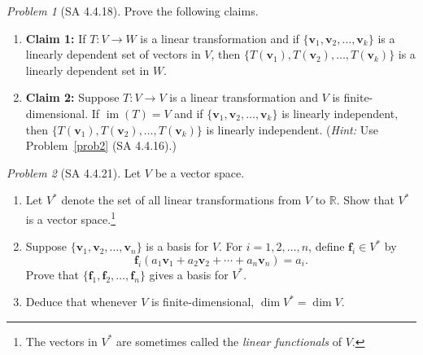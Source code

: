 \documentclass[fleqn,11pt]{paper}
\theoremstyle{remark}
\newtheorem{problem}{Problem}
\newtheorem*{solution}{{\bf Solution}}
\newcommand\R{\fld{R}}
\renewcommand{\dim}{\ensuremath{\operatorname{dim}}}
\newcommand\im{\ensuremath{\operatorname{im}}}
\renewcommand{\vec}[1]{\mathbf{#1}}
\newcommand{\<}{\ensuremath{\langle}}
\renewcommand{\>}{\ensuremath{\rangle}}
\newcommand\fld[1]{\ensuremath{\mathbb{#1}}}
\newcommand\vf{\vec{f}}
\newcommand\vv{\vec{v}}
\begin{document}
\newpage

\begin{problem}[SA 4.4.18]
Prove the following claims.
\begin{enumerate}[{\bf a.}]
\item {\bf Claim 1:}
  If $T : V \to W$ is a linear transformation and  
  if $\{\vv_1, \vv_2, \dots, \vv_k \}$ is a linearly dependent set of vectors in
  $V$, then $\{T(\vv_1), T(\vv_2), \dots , T(\vv_k)\}$ is a 
  linearly dependent set in $W$. 
\item {\bf Claim 2:}
  Suppose $T : V \to V$ is a linear transformation and $V$ is
  finite-dimensional.
  If $\im(T) = V$ and if $\{\vv_1, \vv_2, \dots, \vv_k \}$
  is linearly independent, then $\{T(\vv_1), T(\vv_2), \dots , T(\vv_k)\}$ is 
  linearly independent.
  ({\it Hint:} Use Problem~\ref{prob2} (SA 4.4.16).)
\end{enumerate}
\end{problem}
\newpage

\begin{problem}[SA 4.4.21]
Let $V$ be a vector space.
\begin{enumerate}[{\bf a.}]
\item 
Let $V^\ast$ denote the set of all linear transformations from $V$ to $\R$. 
Show that $V^\ast$ is a vector space.\footnote{The vectors in 
$V^\ast$ are sometimes called the \emph{linear functionals} of $V$.}

\item Suppose $\{\vv_1, \vv_2, \dots, \vv_n\}$ is a basis for $V$. 
For $i = 1, 2, \dots, n$, define $\vf_i \in V^\ast$ by
\[
\vf_i (a_1 \vv_1 + a_2 \vv_2 + \cdots + a_n \vv_n) = a_i.
\]
Prove that $\{\vf_1, \vf_2, \dots, \vf_n\}$ gives a basis for $V^\ast$.
\item Deduce that whenever $V$ is finite-dimensional, $\dim V^\ast = \dim V$.
\end{enumerate}
\end{problem}
\newpage
\end{document}

